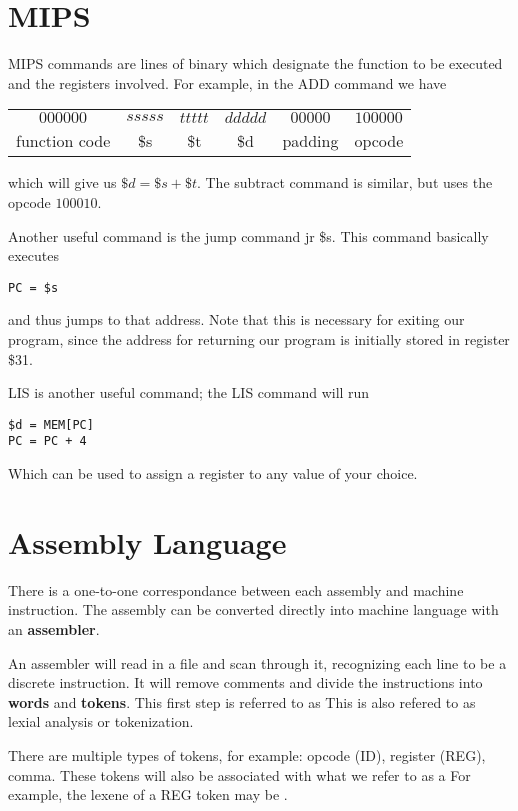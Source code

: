 \documentclass[12pt]{article}
\begin{document}
\section*{MIPS}
MIPS commands are lines of binary which designate the function to be executed and the registers involved. For example, in the ADD command we have \newline
\begin{table}[ht]
\centering
\begin{tabular}{cccccc}
  $000000$ & $sssss$ & $ttttt$ & $ddddd$ & $00000$ & $100000$ \\
  function code & \$s & \$t & \$d & padding & opcode \\
  \end{tabular}
\end{table}

which will give us $\$d = \$s + \$t$. The subtract command is similar, but uses the opcode $100010$.

Another useful command is the jump command jr \$s. This command basically executes
\begin{verbatim}
PC = $s
\end{verbatim}
and thus jumps to that address. Note that this is necessary for exiting our program, since the address for returning our program is initially stored in register \$31.

LIS is another useful command; the LIS command will run
\begin{verbatim}
$d = MEM[PC]
PC = PC + 4
\end{verbatim}
Which can be used to assign a register to any value of your choice.

\section*{Assembly Language}
There is a one-to-one correspondance between each assembly and machine instruction. The assembly can be converted directly into machine language with an {\bf assembler}.

An assembler will read in a file and scan through it, recognizing each line to be a discrete instruction. It will remove comments and divide the instructions into {\bf words} and {\bf tokens}. This first step is referred to as  This is also refered to as lexial analysis or tokenization.

There are multiple types of tokens, for example: opcode (ID), register (REG), comma. These tokens will also be associated with what we refer to as a  For example, the lexene of a REG token may be .
\end{document}
